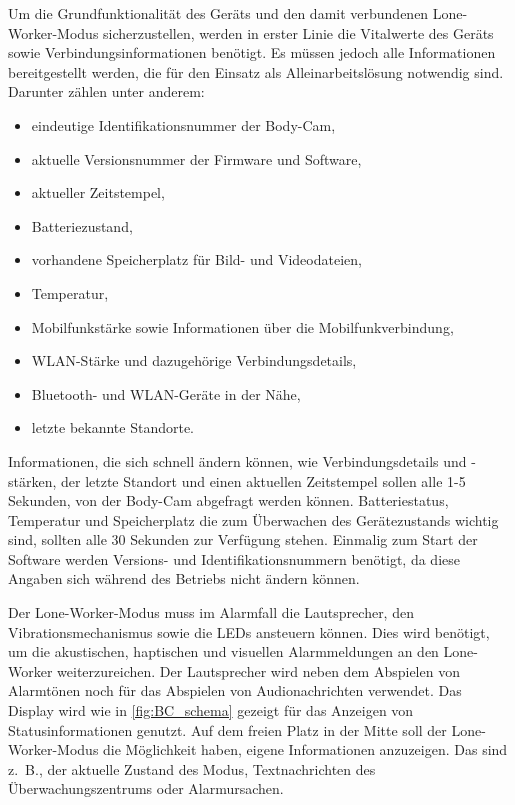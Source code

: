 \documentclass[thesis.tex]{subfiles}
\begin{document}
Um die Grundfunktionalität des Geräts und den damit verbundenen Lone-Worker-Modus sicherzustellen, werden in erster Linie
die Vitalwerte des Geräts sowie Verbindungsinformationen benötigt.
Es müssen jedoch alle Informationen bereitgestellt werden, die für den Einsatz als Alleinarbeitslösung notwendig sind.
Darunter zählen unter anderem:
\begin{itemize}
    \item eindeutige Identifikationsnummer der Body-Cam,
    \item aktuelle Versionsnummer der Firmware und Software,
    \item aktueller Zeitstempel,
    \item Batteriezustand,
    \item vorhandene Speicherplatz für Bild- und Videodateien,
    \item Temperatur,
    \item Mobilfunkstärke sowie Informationen über die Mobilfunkverbindung,
    \item WLAN-Stärke und dazugehörige Verbindungsdetails,
    \item Bluetooth- und WLAN-Geräte in der Nähe,
    \item letzte bekannte Standorte.
\end{itemize}

Informationen, die sich schnell ändern können, wie Verbindungsdetails und -stärken, der letzte Standort und
einen aktuellen Zeitstempel sollen alle 1-5 Sekunden, von der Body-Cam abgefragt werden können.
Batteriestatus, Temperatur und Speicherplatz die zum Überwachen des Gerätezustands wichtig sind, sollten alle 30 Sekunden zur Verfügung stehen.
Einmalig zum Start der Software werden Versions- und Identifikationsnummern benötigt, da diese Angaben sich während des Betriebs nicht ändern können.

Der Lone-Worker-Modus muss im Alarmfall die Lautsprecher, den Vibrationsmechanismus sowie die LEDs ansteuern können.
Dies wird benötigt, um die akustischen, haptischen und visuellen Alarmmeldungen an den Lone-Worker weiterzureichen.
Der Lautsprecher wird neben dem Abspielen von Alarmtönen noch für das Abspielen von Audionachrichten verwendet.
Das Display wird wie in \autoref{fig:BC_schema} gezeigt für das Anzeigen von Statusinformationen genutzt.
Auf dem freien Platz in der Mitte soll der Lone-Worker-Modus die Möglichkeit haben, eigene Informationen anzuzeigen.
Das sind z.~B., der aktuelle Zustand des Modus, Textnachrichten des Überwachungszentrums oder Alarmursachen.
\end{document}
